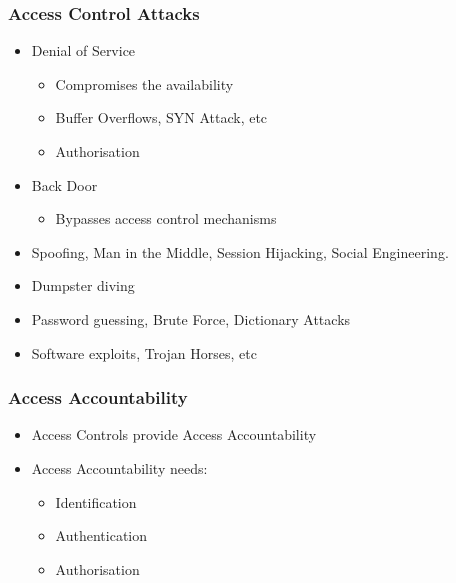 \documentclass{beamer}
\begin{document}
\begin{frame}
\frametitle{Access Control Attacks}

\begin{itemize}

\item Denial of Service
  \begin{itemize}
  \item Compromises the availability
  \item Buffer Overflows, SYN Attack, etc
  \item Authorisation
  \end{itemize}
\item Back Door
  \begin{itemize}
  \item Bypasses access control mechanisms
  \end{itemize}
\item Spoofing, Man in the Middle, Session Hijacking, Social Engineering.
\item Dumpster diving
\item Password guessing, Brute Force, Dictionary Attacks
\item Software exploits, Trojan Horses, etc

\end{itemize}

\end{frame}



\begin{frame}
\frametitle{Access Accountability}

\begin{itemize}
\item Access Controls provide Access Accountability 
\item Access Accountability needs:
  \begin{itemize}
  \item Identification
  \item Authentication
  \item Authorisation
  \end{itemize}
\end{itemize}

\end{frame}
\end{document}
